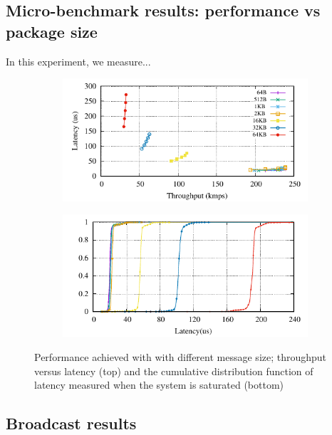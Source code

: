 \subsection{Micro-benchmark results: performance vs package size}
\label{sec:evaluation:micro}
In this experiment, we measure...

\begin{figure}[htp!]
  \begin{subfigure}{\columnwidth}
    \centering
    \includegraphics[width=0.99\columnwidth]{figures/benchmark/graphs/figure-performance-vs-size-single-group}
  \label{fig:tpcc_repartitioning}
  \end{subfigure}
  \begin{subfigure}{\columnwidth}
    \centering
    \includegraphics[width=0.95\columnwidth]{figures/benchmark/graphs/figure-performance-vs-size-single-group-cdf}
  \end{subfigure}
  \caption{Performance achieved with \libname with different message size; throughput versus latency (top) and the cumulative distribution function of latency measured when the system is saturated (bottom)}
\end{figure}

\subsection{Broadcast results}
\label{sec:evaluation:broadcast}

